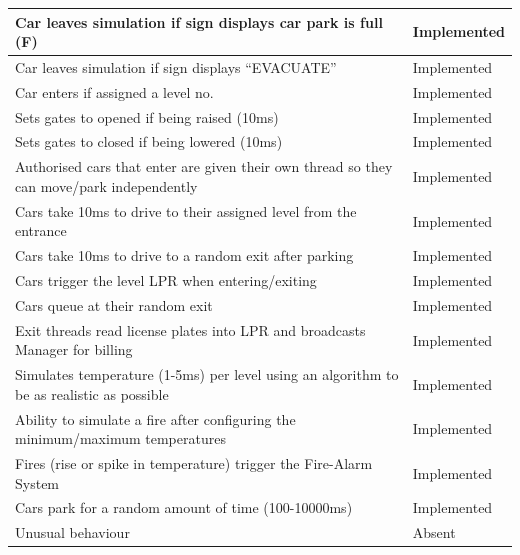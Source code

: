 \documentclass[a4paper]{article}
\begin{document}
\begin{tabular}{|m{24.7em}|l|}
  \hline
  Car leaves simulation if sign displays car park is full (F) & \cellcolor{green!40}Implemented\\
  \hline
  Car leaves simulation if sign displays “EVACUATE” & \cellcolor{green!40}Implemented\\
  \hline
  Car enters if assigned a level no. & \cellcolor{green!40}Implemented\\
  \hline
  Sets gates to opened if being raised (10ms) & \cellcolor{green!40}Implemented\\
  \hline
  Sets gates to closed if being lowered (10ms) & \cellcolor{green!40}Implemented\\
  \hline
  Authorised cars that enter are given their own thread so they can move/park independently & \cellcolor{green!40}Implemented\\
  \hline
  Cars take 10ms to drive to their assigned level from the entrance & \cellcolor{green!40}Implemented\\
  \hline
  Cars take 10ms to drive to a random exit after parking & \cellcolor{green!40}Implemented\\
  \hline
  Cars trigger the level LPR when entering/exiting & \cellcolor{green!40}Implemented\\
  \hline
  Cars queue at their random exit & \cellcolor{green!40}Implemented\\
  \hline
  Exit threads read license plates into LPR and broadcasts Manager for billing & \cellcolor{green!40}Implemented\\
  \hline
  Simulates temperature (1-5ms) per level using an algorithm to be as realistic as possible & \cellcolor{green!40}Implemented\\
  \hline
  Ability to simulate a fire after configuring the minimum/maximum temperatures & \cellcolor{green!40}Implemented\\
  \hline
  Fires (rise or spike in temperature) trigger the Fire-Alarm System & \cellcolor{green!40}Implemented\\
  \hline
  Cars park for a random amount of time (100-10000ms) & \cellcolor{green!40}Implemented\\
  \hline
  Unusual behaviour & \cellcolor{red!40}Absent\\
  \hline
\end{tabular}
\end{document}
